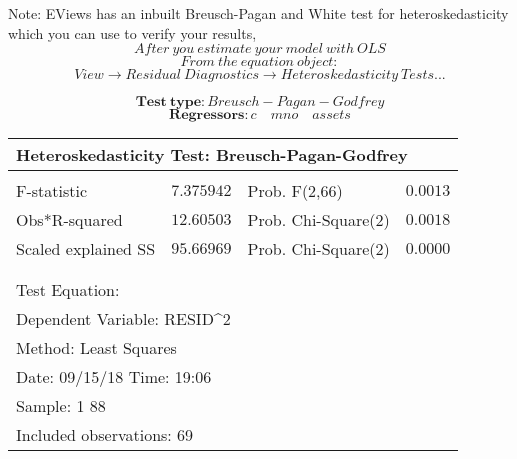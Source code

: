 \documentclass[12pt]{report}
\begin{document}
\noindent Note: EViews has an inbuilt Breusch-Pagan and White test for heteroskedasticity which you can use to verify your results,
$$After\ you\ estimate\ your\ model\ with\ OLS$$
$$From\ the\ equation\ object:$$
$$View \to Residual\ Diagnostics \to Heteroskedasticity\ Tests... $$
\begin{figure}[H]
	\centering
\end{figure}
\vspace{-\baselineskip}
\begin{figure}[H]
	\centering
\end{figure}
\vspace{-\baselineskip}
$$\textbf{Test}\ \textbf{type}: Breusch-Pagan-Godfrey$$ $$\textbf{Regressors}: c \quad mno \quad assets$$
\begin{table}[H]
	\centering
	\begin{tabular}{lrrrr}
		\multicolumn{5}{l}{Heteroskedasticity Test: Breusch-Pagan-Godfrey}\\
		[4.5pt] \hline \\ [-4.5pt]
		\multicolumn{1}{l}{F-statistic}&\multicolumn{1}{r}{$7.375942$}&\multicolumn{2}{l}{Prob. F(2,66)}&\multicolumn{1}{r}{$0.0013$}\\
		\multicolumn{1}{l}{Obs*R-squared}&\multicolumn{1}{r}{$12.60503$}&\multicolumn{2}{l}{Prob. Chi-Square(2)}&\multicolumn{1}{r}{$0.0018$}\\
		\multicolumn{1}{l}{Scaled explained SS}&\multicolumn{1}{r}{$95.66969$}&\multicolumn{2}{l}{Prob. Chi-Square(2)}&\multicolumn{1}{r}{$0.0000$}\\
		[4.5pt] \hline \\ [-4.5pt]
		\multicolumn{1}{c}{}&\multicolumn{1}{c}{}&\multicolumn{1}{c}{}&\multicolumn{1}{c}{}&\multicolumn{1}{c}{}\\
		\multicolumn{2}{l}{Test Equation:}&\multicolumn{1}{c}{}&\multicolumn{1}{c}{}&\multicolumn{1}{c}{}\\
		\multicolumn{3}{l}{Dependent Variable: RESID\textasciicircum 2}&\multicolumn{1}{c}{}&\multicolumn{1}{c}{}\\
		\multicolumn{3}{l}{Method: Least Squares}&\multicolumn{1}{c}{}&\multicolumn{1}{c}{}\\
		\multicolumn{3}{l}{Date: 09/15/18   Time: 19:06}&\multicolumn{1}{c}{}&\multicolumn{1}{c}{}\\
		\multicolumn{2}{l}{Sample: 1 88}&\multicolumn{1}{c}{}&\multicolumn{1}{c}{}&\multicolumn{1}{c}{}\\
		\multicolumn{3}{l}{Included observations: 69}&\multicolumn{1}{c}{}&\multicolumn{1}{c}{}\\

\end{tabular}
\end{table}
\end{document}
